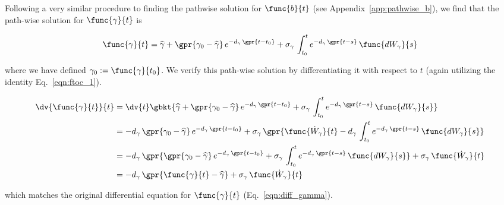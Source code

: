 Following a very similar procedure to finding the pathwise solution for $\func{b}{t}$ (see Appendix~\ref{app:pathwise_b}), we find that the path-wise solution for $\func{\gamma}{t}$ is

\begin{equation}
    \func{\gamma}{t} = \widehat{\gamma} + \gpr{\gamma_0 - \widehat{\gamma}}\,e^{-d_{\gamma}\,\gpr{t - t_0}} + \sigma_{\gamma}\,\int_{t_{0}}^{t} e^{-d_{\gamma}\,\gpr{t - s}}\,\func{d{W}_{\gamma}}{s}
    \label{eqn:pathwise_gamma}
\end{equation}

where we have defined $\gamma_{0} := \func{\gamma}{t_0}$. We verify this path-wise solution by differentiating it with respect to $t$ (again utilizing the identity Eq.~\ref{eqn:ftoc_1}).

\begin{align}
    \dv{\func{\gamma}{t}}{t} &= \dv{t} \gbkt{\widehat{\gamma} + \gpr{\gamma_0 - \widehat{\gamma}}\,e^{-d_{\gamma}\,\gpr{t - t_0}} + \sigma_{\gamma}\,\int_{t_{0}}^{t} e^{-d_{\gamma}\,\gpr{t - s}}\,\func{d{W}_{\gamma}}{s}} \nonumber \\
    	&= -d_{\gamma}\,\gpr{\gamma_0 - \widehat{\gamma}}\,e^{-d_{\gamma}\,\gpr{t - t_0}} + \sigma_{\gamma}\,\gpr{\func{\dot{W}_{\gamma}}{t} - d_{\gamma}\,\int_{t_{0}}^{t} e^{-d_{\gamma}\,\gpr{t - s}}\,\func{d{W}_{\gamma}}{s}} \nonumber \\
    	&= -d_{\gamma}\,\gpr{\gpr{\gamma_0 - \widehat{\gamma}}\,e^{-d_{\gamma}\,\gpr{t - t_0}} + \sigma_{\gamma}\,\int_{t_{0}}^{t} e^{-d_{\gamma}\,\gpr{t - s}}\,\func{d{W}_{\gamma}}{s}} + \sigma_{\gamma}\,\func{\dot{W}_{\gamma}}{t} \nonumber \\
    	&= -d_{\gamma}\,\gpr{\func{\gamma}{t} - \widehat{\gamma}} + \sigma_{\gamma}\,\func{\dot{W}_{\gamma}}{t}
\end{align}

which matches the original differential equation for $\func{\gamma}{t}$ (Eq.~\ref{eqn:diff_gamma}).